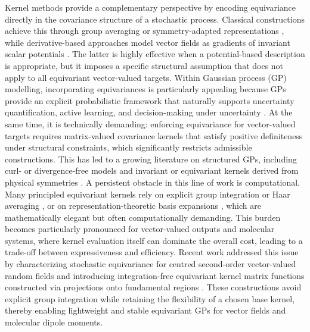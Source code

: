 \documentclass[11pt,a4paper]{article}
\begin{document}
Kernel methods provide a complementary perspective by encoding equivariance directly in the covariance structure of a stochastic process. Classical constructions achieve this through group averaging or symmetry-adapted representations \citep{PhysRevB.95.214302,holderrieth2021equivariant,Soapgp}, while derivative-based approaches model vector fields as gradients of invariant scalar potentials \cite{SS2012,berlinghieri2023gaussian,Sun_2022}. The latter is highly effective when a potential-based description is appropriate, but it imposes a specific structural assumption that does not apply to all equivariant vector-valued targets. Within Gaussian process (GP) modelling, incorporating equivariances is particularly appealing because GPs provide an explicit probabilistic framework that naturally supports uncertainty quantification, active learning, and decision-making under uncertainty \citep{moss2020gaussian,griffiths2022data,rankovic2024bayesian}. At the same time, it is technically demanding: enforcing equivariance for vector-valued targets requires matrix-valued covariance kernels that satisfy positive definiteness under structural constraints, which significantly restricts admissible constructions. This has led to a growing literature on structured GPs, including curl- or divergence-free models \cite{SS2012} and invariant or equivariant kernels derived from physical symmetries \cite{AFST_2012_6_21_3_501_0,GINSBOURGER2016117,van2018learning,holderrieth2021equivariant,henderson2023pde}. A persistent obstacle in this line of work is computational. Many principled equivariant kernels rely on explicit group integration or Haar averaging \citep{JMLR:v8:reisert07a}, or on representation-theoretic basis expansions \citep{Soapgp}, which are mathematically elegant but often computationally demanding. This burden becomes particularly pronounced for vector-valued outputs and molecular systems, where kernel evaluation itself can dominate the overall cost, leading to a trade-off between expressiveness and efficiency. Recent work \citep{steinertintegration} addressed this issue by characterizing stochastic equivariance for centred second-order vector-valued random fields and introducing {integration-free} equivariant kernel matrix functions constructed via projections onto fundamental regions \citep{aslan23a,AFST_2012_6_21_3_501_0}. These constructions avoid explicit group integration while retaining the flexibility of a chosen base kernel, thereby enabling lightweight and stable equivariant GPs for vector fields and molecular dipole moments.
\end{document}
